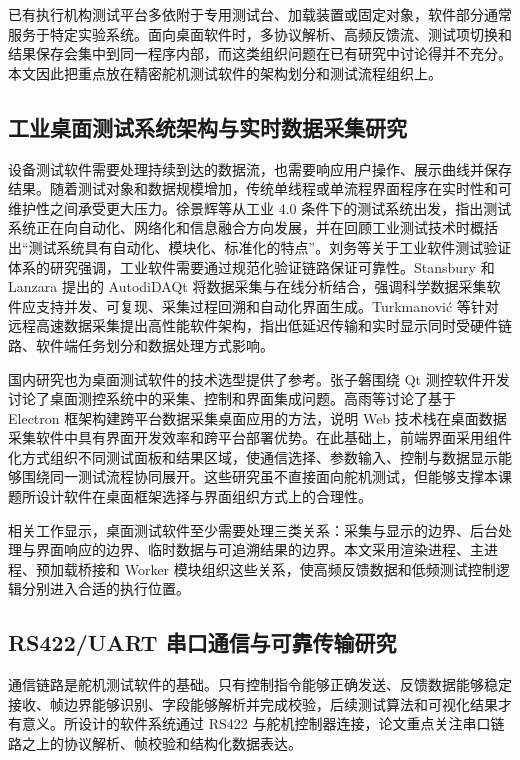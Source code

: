 已有执行机构测试平台多依附于专用测试台、加载装置或固定对象，软件部分通常服务于特定实验系统。面向桌面软件时，多协议解析、高频反馈流、测试项切换和结果保存会集中到同一程序内部，而这类组织问题在已有研究中讨论得并不充分。本文因此把重点放在精密舵机测试软件的架构划分和测试流程组织上。

\subsection{工业桌面测试系统架构与实时数据采集研究}

设备测试软件需要处理持续到达的数据流，也需要响应用户操作、展示曲线并保存结果。随着测试对象和数据规模增加，传统单线程或单流程界面程序在实时性和可维护性之间承受更大压力。徐景辉等从工业 4.0 条件下的测试系统出发，指出测试系统正在向自动化、网络化和信息融合方向发展，并在回顾工业测试技术时概括出``测试系统具有自动化、模块化、标准化的特点''\cite{xu2021industry4test}。刘务等关于工业软件测试验证体系的研究强调，工业软件需要通过规范化验证链路保证可靠性\cite{liu2022industrialsoftware}。Stansbury 和 Lanzara 提出的 AutodiDAQt 将数据采集与在线分析结合，强调科学数据采集软件应支持并发、可复现、采集过程回溯和自动化界面生成\cite{stansbury2023autodidaqt}。Turkmanovi\'c 等针对远程高速数据采集提出高性能软件架构，指出低延迟传输和实时显示同时受硬件链路、软件端任务划分和数据处理方式影响\cite{turkmanovic2023highspeed}。

国内研究也为桌面测试软件的技术选型提供了参考。张子磐围绕 Qt 测控软件开发讨论了桌面测控系统中的采集、控制和界面集成问题\cite{zhang2017qtflowmeter}。高雨等讨论了基于 Electron 框架构建跨平台数据采集桌面应用的方法，说明 Web 技术栈在桌面数据采集软件中具有界面开发效率和跨平台部署优势\cite{gao2025electron}。在此基础上，前端界面采用组件化方式组织不同测试面板和结果区域，使通信选择、参数输入、控制与数据显示能够围绕同一测试流程协同展开。这些研究虽不直接面向舵机测试，但能够支撑本课题所设计软件在桌面框架选择与界面组织方式上的合理性。

相关工作显示，桌面测试软件至少需要处理三类关系：采集与显示的边界、后台处理与界面响应的边界、临时数据与可追溯结果的边界。本文采用渲染进程、主进程、预加载桥接和 Worker 模块组织这些关系，使高频反馈数据和低频测试控制逻辑分别进入合适的执行位置。

\subsection{RS422/UART 串口通信与可靠传输研究}

通信链路是舵机测试软件的基础。只有控制指令能够正确发送、反馈数据能够稳定接收、帧边界能够识别、字段能够解析并完成校验，后续测试算法和可视化结果才有意义。所设计的软件系统通过 RS422 与舵机控制器连接，论文重点关注串口链路之上的协议解析、帧校验和结构化数据表达。


